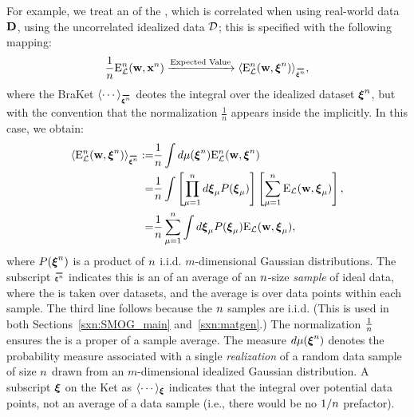 For example, we treat an \ExpectedValue of the \DataSampleError , which is correlated when using real-world data $\mathbf{D}$, using the uncorrelated idealized data $\mathcal{D}$; this is specified with the following mapping:
\begin{align}
  \label{eqn:Emap}
  \frac{1}{\ND}\DETOPX \xrightarrow{\text{Expected Value}} \langle \DETOPXI \rangle_{\AVGNDXIn}  , %
\end{align}
where the BraKet $\langle\cdots\rangle_{\AVGNDXIn}$ deotes the integral over the idealized dataset $\boldsymbol{\xi}^{n}$, but with the convention that the normalization $\tfrac{1}{n}$
appears inside the \BraKet implicitly.
In this case, we obtain:
\begin{align}
\nonumber
  \langle \DETOPXI\rangle_{\AVGNDXIn}
  :=  &\frac{1}{\ND}\int d\mu(\NDXIn) \DETOPXI \\ 
  = &
  \frac{1}{\ND}\int \left[ \prod_{\mu=1}^{\ND}d\XI_{\mu}P(\XI_{\mu})\right] \left[ \sum_{\mu=1}^{\ND}\DETmu \right] , \\ \nonumber
  = &
  \frac{1}{\ND}\sum_{\mu=1}^{\ND}\int d\XI_{\mu}P(\XI_{\mu})\DETmu  , 
    \label{eqn:average_data_sample_error}
\end{align}
where $P(\boldsymbol{\xi}^{n})$ is a product of $n$ i.i.d. $m$-dimensional Gaussian distributions.
The subscript $\AVGNDXIn$ indicates this is an
\ExpectedValue of an average of an $n$-size \emph{sample} of ideal data, where the \ExpectedValue is taken over datasets, and the average is over data points within each sample. The third line follows because the $n$ samples are i.i.d.
(This is used in both Sections~\ref{sxn:SMOG_main} and~\ref{sxn:matgen}.)
The normalization $\tfrac{1}{n}$ ensures the \BraKet is a proper \ExpectedValue of a sample average.
The measure $d\mu(\boldsymbol{\xi}^{n})$ 
denotes the probability measure associated with a single 
\emph{realization} of a random data sample of size $n$ drawn from an $m$-dimensional idealized Gaussian distribution.
A subscript $\boldsymbol{\xi}$ on the Ket as $\langle\cdots\rangle_{\boldsymbol{\xi}}$ indicates that the integral over potential data points, not an average of a data sample (i.e., there would be no $1/n$ prefactor).
%

